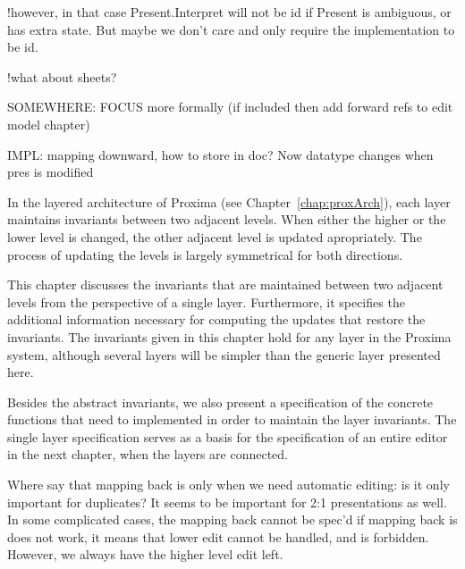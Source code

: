 !however, in that case Present.Interpret will not be id if Present is ambiguous, or 
has extra state. But maybe we don't care and only require the implementation to be id.

!what about sheets? 

SOMEWHERE: FOCUS more formally (if included then add forward refs to edit model chapter)


IMPL: mapping downward, how to store in doc? Now datatype changes when pres is modified

\ec



In the layered architecture of Proxima (see Chapter~\ref{chap:proxArch}), each layer maintains invariants between two adjacent levels. When either the higher or the lower level is changed, the other adjacent level is updated apropriately. The process of updating the levels is largely symmetrical for both directions.

This chapter discusses the invariants that are maintained between two adjacent levels from the perspective of a single layer. Furthermore, it specifies the additional information necessary for computing the updates that restore the invariants. The invariants given in this chapter hold for any layer in the Proxima system, although several layers will be simpler than the generic layer presented here.

Besides the abstract invariants, we also present a specification of the concrete functions that need to implemented in order to maintain the layer invariants. The single layer specification serves as a basis for the specification of an entire editor in the next chapter, when the layers are connected.




\bc
Where say that mapping back is only when we need automatic editing: is it only important for duplicates? It seems to be important for 2:1 presentations as well.  In some complicated cases, the mapping back cannot be spec'd if mapping back is does not work, it means that lower edit cannot be handled, and is forbidden. However, we always have the higher level edit left.
\ec


